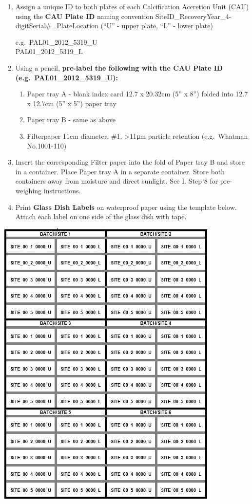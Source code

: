 \documentclass[]{book}
\providecommand{\tightlist}{%
  \setlength{\itemsep}{0pt}\setlength{\parskip}{0pt}}
\begin{document}
\begin{enumerate}
\def\labelenumi{\arabic{enumi}.}
\item
  Assign a unique ID to both plates of each Calcification Accretion Unit (CAU) using the \textbf{CAU Plate ID} naming convention SiteID\_RecoveryYear\_4-digitSerial\#\_PlateLocation (``U'' - upper plate, ``L'' - lower plate)

  e.g.~PAL01\_2012\_5319\_U\\
  PAL01\_2012\_5319\_L
\item
  Using a pencil, \textbf{pre-label the following with the CAU Plate ID (e.g.~PAL01\_2012\_5319\_U):}

  \begin{enumerate}
  \def\labelenumii{\alph{enumii}.}
  \tightlist
  \item
    Paper tray A - blank index card 12.7 x 20.32cm (5'' x 8'') folded into 12.7 x 12.7cm (5'' x 5'') paper tray\\
  \item
    Paper tray B - same as above\\
  \item
    Filterpaper 11cm diameter, \#1, \textgreater11μm particle retention (e.g.~Whatman No.1001-110)
  \end{enumerate}
\item
  Insert the corresponding Filter paper into the fold of Paper tray B and store in a container. Place Paper tray A in a separate container. Store both containers away from moisture and direct sunlight. See I. Step 8 for pre-weighing instructions.
\item
  Print \textbf{Glass Dish Labels} on waterproof paper using the template below. Attach each label on one side of the glass dish with tape.
\end{enumerate}

\includegraphics{images/Template1.jpg}
\end{document}
